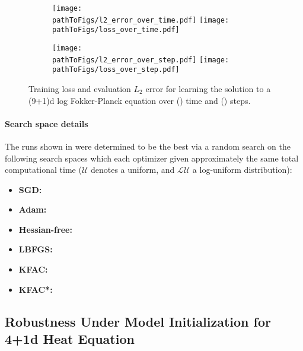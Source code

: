 \begin{figure}[!h]
  \centering
  \def\pathToFigs{kfac_pinns_exp/exp43_log_fokker_planck9d_isotropic_gaussian_random}
  \begin{subfigure}[t]{1.0\linewidth}
    \caption{}\label{subfig:fokker_10d-time}
    \texttt{[image: \\pathToFigs/l2\_error\_over\_time.pdf]}
    \texttt{[image: \\pathToFigs/loss\_over\_time.pdf]}
  \end{subfigure}
  \begin{subfigure}[t]{1.0\linewidth}
    \caption{}\label{subfig:fokker_10d-step}
    \texttt{[image: \\pathToFigs/l2\_error\_over\_step.pdf]}
    \texttt{[image: \\pathToFigs/loss\_over\_step.pdf]}
  \end{subfigure}
  \caption{Training loss and evaluation $L_2$ error for 
  learning the solution to a (9+1)d log Fokker-Planck equation 
  over () time and () steps.}\label{fig:fokker_10d-appendix}
\end{figure}

\paragraph{Search space details} The runs shown in 
 were determined to be the best 
via a random search on the following search spaces which each 
optimizer given approximately the same total 
computational time ($\mathcal{U}$ denotes a uniform, 
and $\mathcal{LU}$ a log-uniform distribution):
\begin{itemize}
  \def\pathToRuns{kfac_pinns_exp/exp43_log_fokker_planck9d_isotropic_gaussian_random/tex}
\item \textbf{SGD:} 
\item \textbf{Adam:} 
\item \textbf{Hessian-free:} 
\item \textbf{LBFGS:} 
\item \textbf{KFAC:} 
\item \textbf{KFAC*:} 
\end{itemize}

\subsection{Robustness Under Model Initialization for 4+1d Heat Equation}\label{sec:4d-heat-robustness-app}

